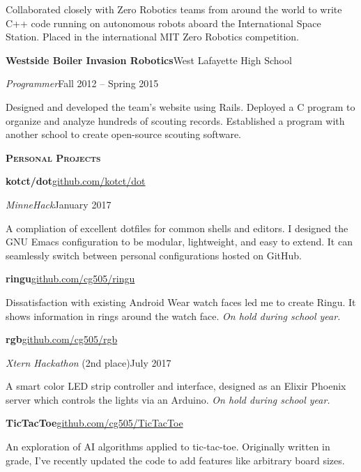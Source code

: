 \documentclass[11pt]{article}
\newcommand{\sectionfont}{\Large\scshape\bfseries\color{cg505green}}
\newcommand{\impact}[1]{\textcolor{cg505green}{\nohyphens{#1}}}
\begin{document}
\begin{minipage}[t]{0.67\textwidth}
\begin{adjustwidth}{10pt}{}
    Collaborated closely with Zero Robotics teams from \impact{around the world} to write C++ code running on autonomous robots aboard the International Space Station.
    \impact{Placed } in the international MIT Zero Robotics competition.
  \end{adjustwidth}

  \textbf{Westside Boiler Invasion Robotics}\hfill West Lafayette High School
  \begin{adjustwidth}{10pt}{}
    \emph{Programmer}\hfill Fall 2012 -- Spring 2015

    Designed and developed the team's website using Rails.
    Deployed a C program to organize and analyze hundreds of scouting records.
    Established a program with another school to create open-source scouting software.
  \end{adjustwidth}

  \vspace{5pt}

  {\sectionfont Personal Projects}

  \textbf{kotct/dot}\hfill\href{https://github.com/kotct/dot/}{github.com/kotct/dot}
  \begin{adjustwidth}{10pt}{}
    \emph{MinneHack}\hfill January 2017

    A compliation of excellent dotfiles for common shells and editors.
    I designed the GNU Emacs configuration to be modular, lightweight, and easy to extend.
    It can seamlessly switch between personal configurations hosted on GitHub.
  \end{adjustwidth}

  \textbf{ringu}\hfill\href{https://github.com/cg505/ringu/}{github.com/cg505/ringu}
  \begin{adjustwidth}{10pt}{}
    Dissatisfaction with existing Android Wear watch faces led me to create Ringu.
    It shows information in rings around the watch face.
    \emph{On hold during school year.}
  \end{adjustwidth}

  \textbf{rgb}\hfill\href{https://github.com/cg505/rgb/}{github.com/cg505/rgb}
  \begin{adjustwidth}{10pt}{}
    \emph{Xtern Hackathon} (2nd place)\hfill July 2017

    A smart color LED strip controller and interface, designed as an Elixir Phoenix server which controls the lights via an Arduino.
    \emph{On hold during school year.}
  \end{adjustwidth}

  \textbf{TicTacToe}\hfill\href{https://github.com/cg505/TicTacToe/}{github.com/cg505/TicTacToe}
  \begin{adjustwidth}{10pt}{}
    An exploration of AI algorithms applied to tic-tac-toe.
    Originally written in  grade, I've recently updated the code to add features like arbitrary board sizes.
  \end{adjustwidth}
\end{minipage}
\end{document}
